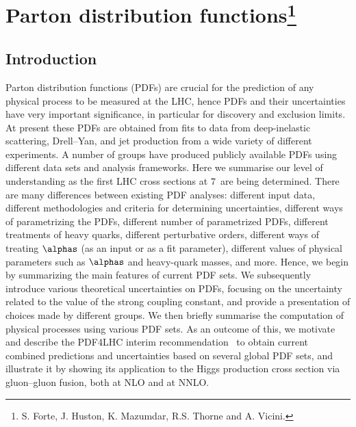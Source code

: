 %
\section{Parton distribution functions\protect\footnote{
  S. Forte, J. Huston, K. Mazumdar, R.S. Thorne and A. Vicini.}}
\label{pdfsection}


\subsection{Introduction}
\label{intro}

Parton distribution functions (PDFs) are crucial for the prediction
of any physical process to be measured at the LHC, hence PDFs and their
uncertainties 
 have very important significance, in particular for discovery and
 exclusion limits. 
At present these PDFs are obtained 
from fits to data from deep-inelastic scattering, Drell--Yan, and
jet production from a wide variety of different experiments. 
A number of groups have produced publicly available PDFs
using different data sets and analysis frameworks. Here we 
summarise our level of understanding as the first LHC cross sections
at $7$\UTeV\ are being determined.  There are many differences between
existing PDF analyses: different input data, different methodologies and 
criteria for  determining uncertainties, different ways of 
parametrizing the PDFs, different
number of parametrized PDFs, different treatments of heavy quarks, 
different perturbative orders,
different ways of treating  $\alphas$ (as an input or as a fit
parameter),
different values of physical parameters such as $\alphas$ and
heavy-quark masses, and more. 
Hence, we begin by summarizing the main features of
current PDF sets. We subsequently introduce various
theoretical uncertainties on PDFs, focusing on the uncertainty related to
the value of the strong coupling constant, and provide a presentation
of choices made by different groups. We then briefly 
summarise the computation of physical processes using various PDF sets. 
As an outcome of this, we motivate and 
describe the PDF4LHC interim recommendation~\cite{PDF4LHCwebpage} 
to obtain current combined predictions and uncertainties based on several 
global PDF sets, and illustrate it by showing its
application to the  Higgs production 
cross section via gluon--gluon fusion, both at
NLO and at NNLO. 

